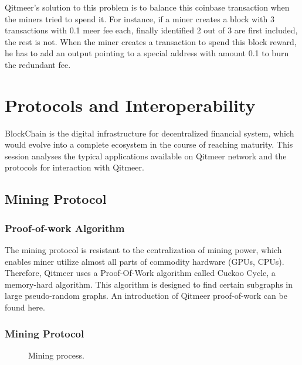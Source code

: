 \documentclass[a4paper,11pt]{article}
\begin{document}
Qitmeer's solution to this problem is to balance this coinbase transaction when the miners tried to spend it. For instance, if a miner creates a block with 3 transactions with 0.1 meer fee each, finally identified 2 out of 3 are first included, the rest is not. When the miner creates a transaction to spend this block reward, he has to add an output pointing to a special address with amount 0.1 to burn the redundant fee.

\section{Protocols and Interoperability}
BlockChain is the digital infrastructure for decentralized financial system, which would evolve into a complete ecosystem in the course of reaching maturity. This session analyses the typical applications available on  Qitmeer network and the protocols for interaction with Qitmeer. 

\subsection{Mining Protocol}
\subsubsection{Proof-of-work Algorithm}

The mining protocol is resistant to the centralization of mining power, which enables miner utilize almost all parts of commodity hardware (GPUs, CPUs).
Therefore, Qitmeer uses a Proof-Of-Work algorithm called Cuckoo Cycle\cite{cuckoocycle},
a memory-hard algorithm. This algorithm is designed to find certain subgraphs in large pseudo-random graphs.
An introduction of Qitmeer proof-of-work can be found here.\cite{qitmeerpow}

\subsubsection{Mining Protocol}

\begin{figure}[ht]
	\centerline{%
	}
	\caption{Mining process.}
\end{figure}
\end{document}
